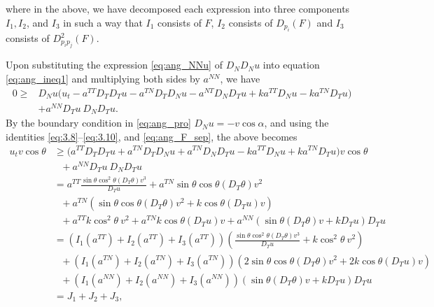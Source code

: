 \documentclass[12pt]{article}
\numberwithin{equation}{section}
\theoremstyle{plain}
\theoremstyle{definition}
\theoremstyle{remark}
\begin{document}
where in the above, we have decomposed each expression into three components $I_1,I_2$,
and $I_3$ in such a way that
$I_1$ consists of $F$, 
$I_2$ consists of $D_{p_i}(F)$ and 
$I_3$ consists of $D^2_{p_i p_j} (F)$. 

Upon substituting the expression \eqref{eq:ang_NNu} of $D_N D_N u$ into equation \eqref{eq:ang_ineq1} and multiplying both sides by $a^{NN}$, we have
\begin{equation}
\begin{split} \label{eq:ang_ineq2}
    0 \geq & D_N u \Big( u_t - a^{TT} D_T D_T u - a^{TN} D_T D_N u - a^{NT} D_N D_T u + k a^{TT} D_N u - k a^{TN} D_T u \Big) \\ 
    & + a^{NN} D_T u \  D_N D_T u.
\end{split}
\end{equation}
By the boundary condition in \eqref{eq:ang_pro} $D_N u= -v\cos{\alpha}$, and using
the identities \eqref{eq:3.8}--\eqref{eq:3.10}, and \eqref{eq:ang_F_sep},  
the above becomes 
\begin{equation} \label{eq:ang_ineq3}
\begin{split}
    u_t v \cos{\theta} & \geq  \Big(a^{TT} D_T D_T u + a^{TN} D_T D_N u + a^{TN} D_N D_T u - k a^{TT} D_N u + k a^{TN} D_T u\Big) v \cos{\theta} \\
    & \ \ \ + a^{NN} D_T u \ D_N D_T u \\
    & =  a^{TT} \frac{ \sin{\theta} \cos^2\theta (D_T \theta) v^3 }{D_T u} 
    + a^{TN} \sin{\theta} \cos{\theta} (D_T \theta) v^2 \\
    & \ \ \ + a^{TN} \left(\sin{\theta} \cos{\theta} (D_T \theta) v^2 + k \cos{\theta} (D_T u) v\right) \\
    & \ \ \ + a^{TT} k \cos^2\theta \ v^2
    + a^{TN} k \cos{\theta} (D_T u) v
    + a^{NN} \left(\sin{\theta} (D_T \theta) v + k D_T u\right) D_T u \\
    & = \left(I_1(a^{TT}) + I_2(a^{TT}) + I_3(a^{TT})\right) \left(\frac{ \sin{\theta} \cos^2\theta (D_T \theta) v^3 }{D_T u} + k \cos^2\theta \ v^2\right) \\
    & \ \ \ + \left(I_1(a^{TN}) + I_2(a^{TN}) + I_3(a^{TN}) \right) \left(2\sin{\theta} \cos{\theta} (D_T \theta) v^2 + 2k \cos{\theta} (D_T u) v \right) \\
    & \ \ \ + \left(I_1(a^{NN}) + I_2(a^{NN}) + I_3(a^{NN}) \right) \left(\sin{\theta} (D_T \theta) v + k D_T u \right) D_T u \\
    & = J_1 +J_2 +J_3,
\end{split}
\end{equation} 
\end{document}
